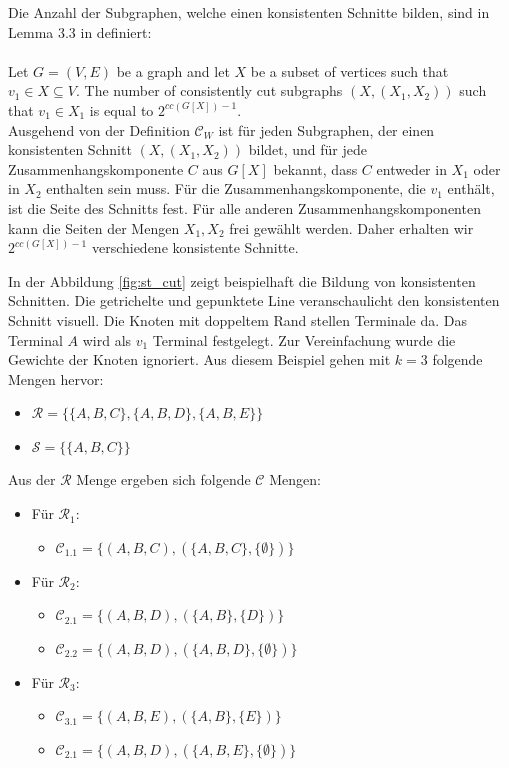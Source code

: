 Die Anzahl der Subgraphen, welche einen konsistenten Schnitte bilden, sind in Lemma 3.3 in \cite{cygan_solving_2011} definiert:\\
\\Let $G=(V,E)$ be a graph and let $X$ be a subset of vertices such that $v_1 \in X \subseteq V$. The number of consistently cut subgraphs $(X,(X_1,X_2))$ such that $v_1 \in X_1$ is equal to $2^{cc(G[X])-1}$.\\

Ausgehend von der Definition $\mathcal{C}_W$ ist für jeden Subgraphen, der einen konsistenten Schnitt $(X,(X_1,X_2))$ bildet, und für jede Zusammenhangskomponente $C$ aus $G[X]$ bekannt, dass  $C$ entweder in $X_1$ oder in $X_2$ enthalten sein muss. Für die Zusammenhangskomponente, die $v_1$ enthält, ist die Seite des Schnitts fest. Für alle anderen Zusammenhangskomponenten kann die Seiten der Mengen $X_1,X_2$ frei gewählt werden. Daher erhalten wir $2^{cc(G[X])-1}$ verschiedene konsistente Schnitte.

In der Abbildung \ref{fig:st_cut} zeigt beispielhaft die Bildung von konsistenten Schnitten. Die getrichelte und gepunktete Line veranschaulicht den konsistenten Schnitt visuell. Die Knoten mit doppeltem Rand stellen Terminale da. Das Terminal $A$ wird als $v_1$ Terminal festgelegt. Zur Vereinfachung wurde die Gewichte der Knoten ignoriert.
Aus diesem Beispiel gehen mit $k=3$ folgende Mengen hervor:
\begin{itemize}
\item $\mathcal{R} = \{\{A,B,C\}, \{A,B,D\}, \{A,B,E\}\}$
\item $\mathcal{S} = \{\{A,B,C\}\}$
\end{itemize}

Aus der $\mathcal{R}$ Menge ergeben sich folgende $\mathcal{C}$ Mengen:
\begin{itemize}
\item Für $\mathcal{R}_1$:
\begin{itemize}
\item $\mathcal{C}_{1.1} = \{(A,B,C),  (\{A,B,C\}, \{\emptyset\})\}$
\end{itemize}
\item Für $\mathcal{R}_2$:
\begin{itemize}
\item $\mathcal{C}_{2.1} = \{(A,B,D),  (\{A,B\}, \{D\})\}$
\item $\mathcal{C}_{2.2} = \{(A,B,D),  (\{A,B,D\}, \{\emptyset\})\}$ 
\end{itemize}
\item Für $\mathcal{R}_3$:
\begin{itemize}
\item $\mathcal{C}_{3.1} = \{(A,B,E),  (\{A,B\}, \{E\})\}$
\item $\mathcal{C}_{2.1} = \{(A,B,D),  (\{A,B,E\}, \{\emptyset\})\}$
\end{itemize}
\end{itemize}

